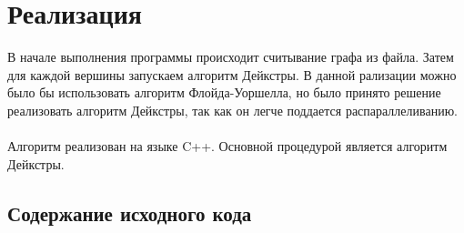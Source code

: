 \documentclass[12pt]{article}
\begin{document}
\section{Реализация} 
В начале выполнения программы происходит считывание графа из файла. 
Затем для каждой вершины запускаем алгоритм Дейкстры. В данной рализации можно было бы использовать 
алгоритм Флойда-Уоршелла, но было принято решение реализовать алгоритм Дейкстры, так как он легче поддается распараллеливанию.

\paragraph{}
Алгоритм реализован на языке C++. Основной процедурой является
алгоритм Дейкстры\cite{dijkstra}.

\subsection{Содержание исходного кода}
\end{document}

